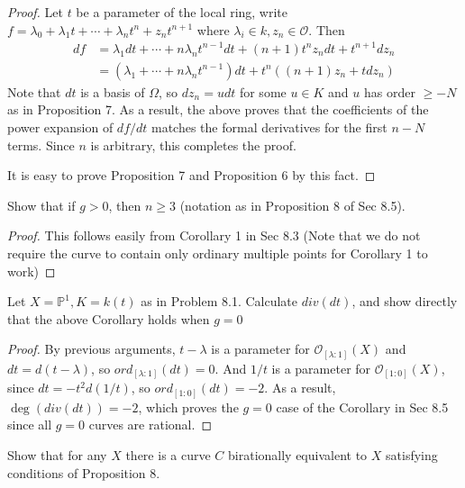 \documentclass{solution}
\begin{document}
\begin{proof}
    Let $t$ be a parameter of the local ring, write $f = \lambda_0 + \lambda_1t + \cdots + \lambda_nt^n + z_n t^{n + 1}$ where $\lambda_i \in k, z_n \in \mathcal{O}$. Then
    $$
        \begin{aligned}
        df &= \lambda_1 dt + \cdots + n \lambda_n t^{n - 1} dt + (n + 1) t^{n} z_n dt + t^{n + 1} dz_n \\
        &= (\lambda_1 + \cdots + n \lambda_n t^{n - 1}) dt + t^{n}((n + 1)z_n + t dz_n)
        \end{aligned}
    $$
    Note that $dt$ is a basis of $\Omega$, so $dz_n = u dt$ for some $u \in K$ and $u$ has order $\ge -N$ as in Proposition 7. As a result, the above proves that the coefficients of the power expansion of $df / dt$ matches the formal derivatives for the first $n - N$ terms. Since $n$ is arbitrary, this completes the proof.

    It is easy to prove Proposition 7 and Proposition 6 by this fact.
\end{proof}

\begin{problem}{8.24}
    Show that if $g \gt 0$, then $n \ge 3$ (notation as in Proposition 8 of Sec 8.5).
\end{problem}

\begin{proof}
    This follows easily from Corollary 1 in Sec 8.3 (Note that we do not require the curve to contain only ordinary multiple points for Corollary 1 to work)
\end{proof}

\begin{problem}{8.25}
    Let $X = \mathbb{P}^1, K = k(t)$ as in Problem 8.1. Calculate $div(dt)$, and show directly that the above Corollary holds when $g = 0$
\end{problem}

\begin{proof}
    By previous arguments, $t - \lambda$ is a parameter for $\mathcal{O}_{[\lambda:1]}(X)$ and $dt = d(t - \lambda)$, so $ord_{[\lambda:1]}(dt) = 0$. And $1 / t$ is a parameter for $\mathcal{O}_{[1:0]}(X)$, since $dt = -t^2 d(1 / t)$, so $ord_{[1:0]}(dt) = -2$. As a result, $\deg(div(dt)) = -2$, which proves the $g = 0$ case of the Corollary in Sec 8.5 since all $g = 0$ curves are rational.
\end{proof}

\begin{problem}{8.26}
    Show that for any $X$ there is a curve $C$ birationally equivalent to $X$ satisfying conditions of Proposition 8.
\end{problem}
\end{document}
